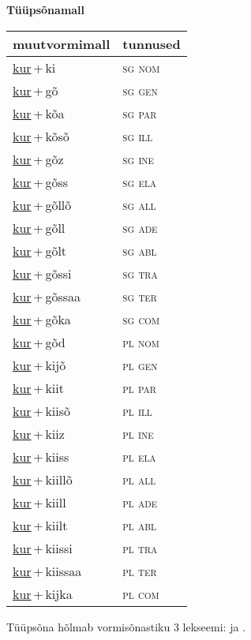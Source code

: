 
\vspace{1.8em}
\begin{minipage}{\textwidth}
\textbf{Tüüpsõnamall \,}\\

\begin{sideways}
\begin{tabular}{l l}
muutvormimall & tunnused \\
\hline
\underline{kur}\,+\,ki & \textsc{ sg nom } \\
\underline{kur}\,+\,gõ & \textsc{ sg gen } \\
\underline{kur}\,+\,kõa & \textsc{ sg par } \\
\underline{kur}\,+\,kõsõ & \textsc{ sg ill } \\
\underline{kur}\,+\,gõz & \textsc{ sg ine } \\
\underline{kur}\,+\,gõss & \textsc{ sg ela } \\
\underline{kur}\,+\,gõllõ & \textsc{ sg all } \\
\underline{kur}\,+\,gõll & \textsc{ sg ade } \\
\underline{kur}\,+\,gõlt & \textsc{ sg abl } \\
\underline{kur}\,+\,gõssi & \textsc{ sg tra } \\
\underline{kur}\,+\,gõssaa & \textsc{ sg ter } \\
\underline{kur}\,+\,gõka & \textsc{ sg com } \\
\underline{kur}\,+\,gõd & \textsc{ pl nom } \\
\underline{kur}\,+\,kijõ & \textsc{ pl gen } \\
\underline{kur}\,+\,kiit & \textsc{ pl par } \\
\underline{kur}\,+\,kiisõ & \textsc{ pl ill } \\
\underline{kur}\,+\,kiiz & \textsc{ pl ine } \\
\underline{kur}\,+\,kiiss & \textsc{ pl ela } \\
\underline{kur}\,+\,kiillõ & \textsc{ pl all } \\
\underline{kur}\,+\,kiill & \textsc{ pl ade } \\
\underline{kur}\,+\,kiilt & \textsc{ pl abl } \\
\underline{kur}\,+\,kiissi & \textsc{ pl tra } \\
\underline{kur}\,+\,kiissaa & \textsc{ pl ter } \\
\underline{kur}\,+\,kijka & \textsc{ pl com } \\
\end{tabular}
\end{sideways}
\label{tab:tüüpsõnamall-kurki}

\end{minipage}

 
\vspace{1em}
\noindent Tüüpsõna hõlmab vormisõnastiku 3 lekseemi:  ja .
